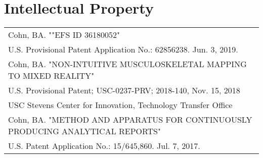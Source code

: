 \documentclass[10pt,a4paper]{article}
\begin{document}
\vspace*{3mm}\section*{Intellectual Property}

  \vspace*{1mm}
  \begin{tabularx}{17cm}{X}


Cohn, BA. ""EFS ID 36180052"\\
 U.S. Provisional Patent Application No.: 62856238. Jun. 3, 2019.\\[2mm]

Cohn, BA. "NON-INTUITIVE MUSCULOSKELETAL MAPPING TO MIXED REALITY"\\
 U.S. Provisional Patent; USC-0237-PRV; 2018-140, Nov. 15, 2018\\
 USC Stevens Center for Innovation, Technology Transfer Office\\[2mm]

 Cohn, BA. "METHOD AND APPARATUS FOR CONTINUOUSLY PRODUCING ANALYTICAL REPORTS"\\
 U.S. Patent Application No.: 15/645,860. Jul. 7, 2017.\\[2mm]


  \end{tabularx}
\end{document}
